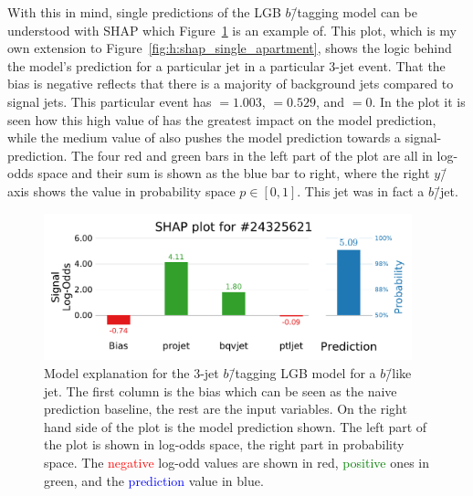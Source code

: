 With this in mind, single predictions of the LGB $b$\=/tagging model can be understood with SHAP which Figure~\ref{fig:q:shap_single_prediction_3j} is an example of. This plot, which is my own extension to Figure~\ref{fig:h:shap_single_apartment}, shows the logic behind the model's prediction for a particular jet in a particular 3-jet event. That the bias is negative reflects that there is a majority of background jets compared to signal jets. This particular event has $=1.003$, $=0.529$, and $=0$. In the plot it is seen how this high value of  has the greatest impact on the model prediction, while the medium value of  also pushes the model prediction towards a signal-prediction. The four red and green bars in the left part of the plot are all in log-odds space and their sum is shown as the blue bar to right, where the right $y$\=/axis shows the value in probability space $p\in [0,1]$. This jet was in fact a $b$\=/jet.

\begin{figure}[h!]
  \centerfloat
  \includegraphics[width=0.95\textwidth, trim=0 0 0 40, clip]{figures/quarks/shap_values-down_sample=1.00-ML_vars=vertex-selection=b-ejet_min=4-n_iter_RS_lgb=99-n_iter_RS_xgb=9-cdot_cut=0.90-version=19-njet=3loc=24325621.pdf}
  \caption[SHAP 3-Jet Model Explanation for $b$\=/Like Jet]
          {Model explanation for the 3-jet $b$\=/tagging LGB model for a $b$\=/like jet. The first column is the bias which can be seen as the naive prediction baseline, the rest are the input variables. On the right hand side of the plot is the model prediction shown. The left part of the plot is shown in log-odds space, the right part in probability space. The \textcolor{red}{negative} log-odd values are shown in red, \textcolor{green}{positive} ones in green, and the \textcolor{blue}{prediction} value in blue. 
          } 
  \label{fig:q:shap_single_prediction_3j}
\end{figure}



